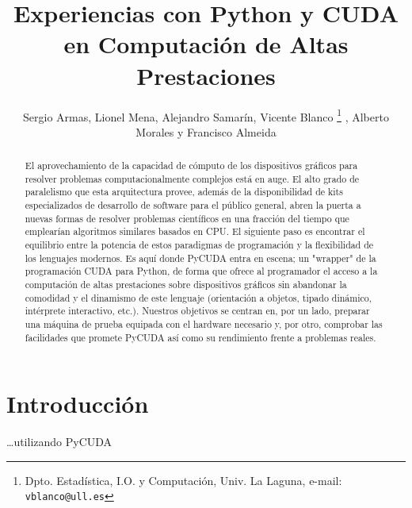 \documentclass[twoside]{article}
\begin{document}
\title{Experiencias con Python y CUDA en Computación de Altas Prestaciones}

\author{Sergio Armas, %
     Lionel Mena, %
     Alejandro Samarín, %
     Vicente Blanco%
     \thanks{Dpto. Estadística, I.O. y Computación, Univ. La Laguna, e-mail: {\tt vblanco@ull.es}} ,%
     Alberto Morales y %
     Francisco Almeida
}

\maketitle
\markboth{}{}
\pagestyle{empty} 
\thispagestyle{empty} %

\begin{abstract}
El aprovechamiento de la capacidad de cómputo de los dispositivos gráficos para resolver problemas computacionalmente complejos está en auge. El alto grado de paralelismo que esta arquitectura provee, además de la disponibilidad de kits especializados de desarrollo de software para el público general, abren la puerta a nuevas formas de resolver problemas científicos en una fracción del tiempo que emplearían algoritmos similares basados en CPU. El siguiente paso es encontrar el equilibrio entre la potencia de estos paradigmas de programación y la flexibilidad de los lenguajes modernos. Es aquí donde PyCUDA entra en escena; un "wrapper" de la programación CUDA para Python, de forma que ofrece al programador el acceso a la computación de altas prestaciones sobre dispositivos gráficos sin abandonar la comodidad y el dinamismo de este lenguaje (orientación a objetos, tipado dinámico, intérprete interactivo, etc.). Nuestros objetivos se centran en, por un lado, preparar una máquina de prueba equipada con el hardware necesario y, por otro, comprobar las facilidades que promete PyCUDA así como su rendimiento frente a problemas reales.
\end{abstract}


\section{Introducción}

\ldots utilizando PyCUDA~\cite{DBLP:journals/corr/abs-0911-3456}
\end{document}
